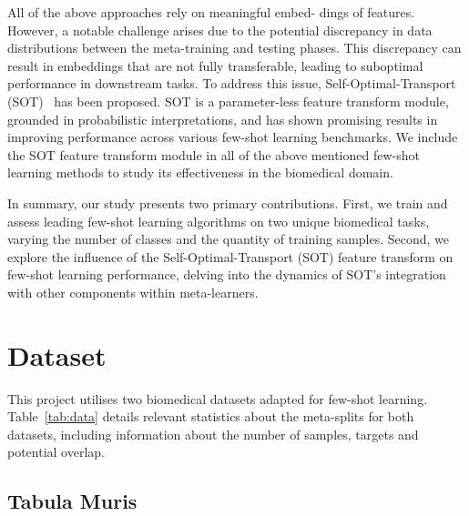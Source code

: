 \documentclass{article}
\begin{document}
All of the above approaches rely on meaningful embed-
dings of features. However, a notable challenge arises due to the potential discrepancy in data distributions between the meta-training and testing phases. This discrepancy can result in embeddings that are not fully transferable, leading to suboptimal performance in downstream tasks. To address this issue, Self-Optimal-Transport (SOT)~\cite{sot} has been proposed. SOT is a parameter-less feature transform module, grounded in probabilistic interpretations, and has shown promising results in improving performance across various few-shot learning benchmarks. We include the SOT feature transform module in all of the above mentioned few-shot learning methods to study its effectiveness in the biomedical domain.

In summary, our study presents two primary contributions. First, we train and assess leading few-shot learning algorithms on two unique biomedical tasks, varying the number of classes and the quantity of training samples. Second, we explore the influence of the Self-Optimal-Transport (SOT) feature transform on few-shot learning performance, delving into the dynamics of SOT's integration with other components within meta-learners.

\section{Dataset}

This project utilises two biomedical datasets adapted for few-shot learning. Table~\ref{tab:data} details relevant statistics about the meta-splits for both datasets, including information about the number of samples, targets and potential overlap.


\subsection{Tabula Muris}

\end{document}
